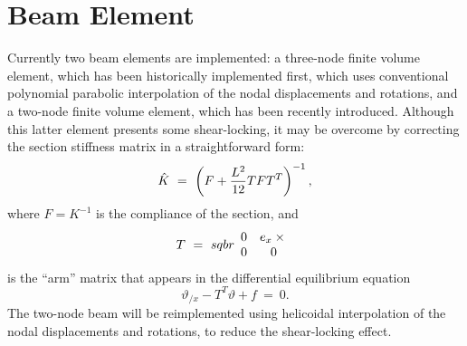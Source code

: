 \section{Beam Element}
Currently two beam elements are implemented: a three-node finite volume
element, which has been historically implemented first, which uses
conventional polynomial parabolic interpolation of the nodal displacements
and rotations, and a two-node finite volume element, which has been
recently introduced.
Although this latter element presents some shear-locking, it may be overcome
by correcting the section stiffness matrix in a straightforward form:
\begin{displaymath}
	\hat{K} \ = \ \plbr{F + \frac{L^2}{12}T F T^T}^{-1} ,
\end{displaymath}
where $F=K^{-1}$ is the compliance of the section, and
\begin{displaymath}
	T \ = \ sqbr{\matr{cc}{
		0 & e_x \times{} \\
		0 & 0
	}}
\end{displaymath}
is the ``arm'' matrix that appears in the differential equilibrium equation
\begin{displaymath}
	\vartheta_{/x} - T^T\vartheta + f \ = \ 0 .
\end{displaymath}
The two-node beam will be reimplemented using helicoidal interpolation
of the nodal displacements and rotations, to reduce the shear-locking effect.


